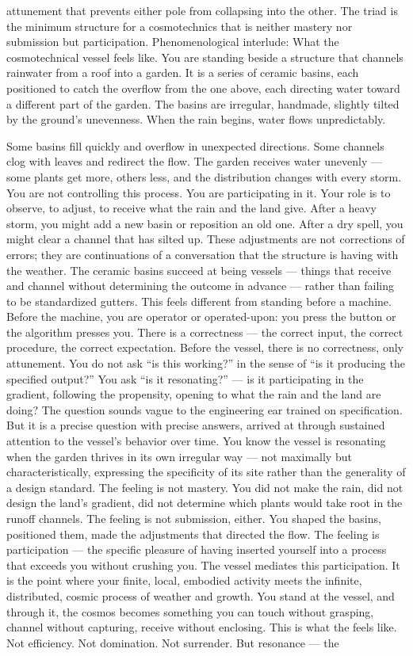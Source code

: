 attunement that prevents either pole from collapsing into the other. The triad is the minimum structure for a cosmotechnics that is neither mastery nor submission but participation. Phenomenological interlude: What the cosmotechnical vessel feels like. You are standing beside a structure that channels rainwater from a roof into a garden. It is a series of ceramic basins, each positioned to catch the overflow from the one above, each directing water toward a different part of the garden. The basins are irregular, handmade, slightly tilted by the ground’s unevenness. When the rain begins, water flows unpredictably.

Some basins fill quickly and overflow in unexpected directions. Some channels clog with leaves and redirect the flow. The garden receives water unevenly — some plants get more, others less, and the distribution changes with every storm. You are not controlling this process. You are participating in it. Your role is to observe, to adjust, to receive what the rain and the land give. After a heavy storm, you might add a new basin or reposition an old one. After a dry spell, you might clear a channel that has silted up. These adjustments are not corrections of errors; they are continuations of a conversation that the structure is having with the weather. The ceramic basins succeed at being vessels — things that receive and channel without determining the outcome in advance — rather than failing to be standardized gutters. This feels different from standing before a machine. Before the machine, you are operator or operated-upon: you press the button or the algorithm presses you. There is a correctness — the correct input, the correct procedure, the correct expectation. Before the vessel, there is no correctness, only attunement. You do not ask “is this working?” in the sense of “is it producing the specified output?” You ask “is it resonating?” — is it participating in the gradient, following the propensity, opening to what the rain and the land are doing? The question sounds vague to the engineering ear trained on specification. But it is a precise question with precise answers, arrived at through sustained attention to the vessel’s behavior over time. You know the vessel is resonating when the garden thrives in its own irregular way — not maximally but characteristically, expressing the specificity of its site rather than the generality of a design standard. The feeling is not mastery. You did not make the rain, did not design the land’s gradient, did not determine which plants would take root in the runoff channels. The feeling is not submission, either. You shaped the basins, positioned them, made the adjustments that directed the flow. The feeling is participation — the specific pleasure of having inserted yourself into a process that exceeds you without crushing you. The vessel mediates this participation. It is the point where your finite, local, embodied activity meets the infinite, distributed, cosmic process of weather and growth. You stand at the vessel, and through it, the cosmos becomes something you can touch without grasping, channel without capturing, receive without enclosing. This is what the   feels like. Not efficiency. Not domination. Not surrender. But resonance — the 
